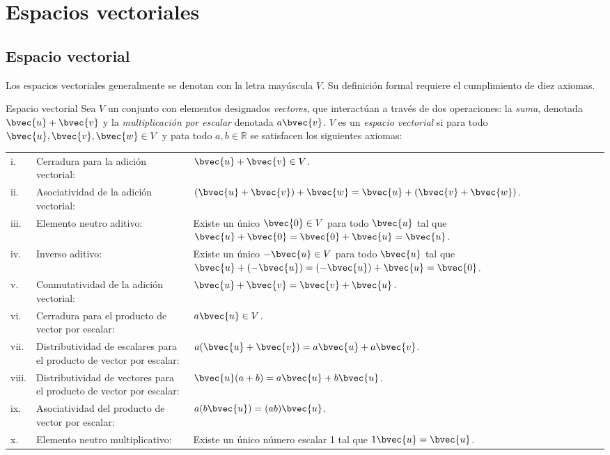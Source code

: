 \documentclass{fmbnotes}
\begin{document}


\section{Espacios vectoriales}\label{sec:espacios_vectoriales}

\subsection{Espacio vectorial}
Los espacios vectoriales generalmente se denotan con la letra mayúscula \(V\). Su definición formal requiere el cumplimiento de diez axiomas.

\begin{definicion}{Espacio vectorial}{}
Sea \(V\) un conjunto con elementos designados \emph{vectores}, que interactúan a través de dos operaciones: la \emph{suma}, denotada \(\bvec{u}+\bvec{v}\) y la \emph{multiplicación por escalar} denotada \(a\bvec{v}\). \(V\) es un \emph{espacio vectorial} si para todo \(\bvec{u}, \bvec{v}, \bvec{w} \in V\) y pata todo \(a,b \in \mathbb{R}\) se satisfacen los siguientes axiomas:

\begin{longtable}{lp{}p{}}
	\rule[1ex]{0pt}{2.5ex}i.&Cerradura para la adición vectorial: &\(\bvec{u}+\bvec{v} \in V\). \\
	\rule[1ex]{0pt}{2.5ex}ii.&Asociatividad de la adición vectorial: &\((\bvec{u}+\bvec{v})+\bvec{w}=\bvec{u}+(\bvec{v}+\bvec{w})\). \\
	\rule[1ex]{0pt}{2.5ex}iii.&Elemento neutro aditivo: &Existe un único \(\bvec{0} \in V\) para todo \(\bvec{u}\) tal que \(\bvec{u}+\bvec{0}=\bvec{0}+\bvec{u}=\bvec{u}\). \\
	\rule[1ex]{0pt}{2.5ex}iv.&Inverso aditivo: &Existe un único \(-\bvec{u} \in V\) para todo \(\bvec{u}\) tal que \(\bvec{u}+(-\bvec{u})=(-\bvec{u})+\bvec{u}=\bvec{0}\). \\
	\rule[1ex]{0pt}{2.5ex}v.&Conmutatividad de la adición vectorial: &\(\bvec{u}+\bvec{v}=\bvec{v}+\bvec{u}\). \\
	\rule[1ex]{0pt}{2.5ex}vi.&Cerradura para el producto de vector por escalar: &\(a\bvec{u} \in V\). \\
	\rule[1ex]{0pt}{2.5ex}vii.&Distributividad de escalares para el producto de vector por escalar: &\(a(\bvec{u}+\bvec{v})=a\bvec{u}+a\bvec{v}\). \\
	\rule[1ex]{0pt}{2.5ex}viii.&Distributividad de vectores para el producto de vector por escalar: &\(\bvec{u}(a+b)=a\bvec{u}+b\bvec{u}\). \\
	\rule[1ex]{0pt}{2.5ex}ix.&Asociatividad del producto de vector por escalar: &\(a(b\bvec{u})=(ab)\bvec{u}\). \\
	\rule[1ex]{0pt}{2.5ex}x.&Elemento neutro multiplicativo: &Existe un único número escalar 1 tal que \(1\bvec{u}=\bvec{u}\). \\
\end{longtable}

\end{definicion}
\end{document}

